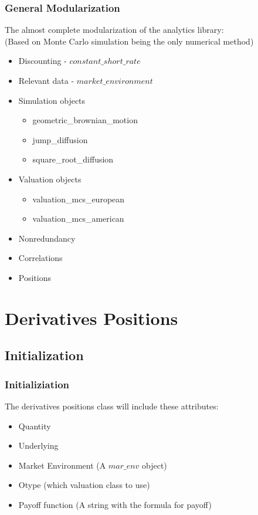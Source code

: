 \documentclass{beamer}
\begin{document}
\begin{frame}
\frametitle{General Modularization}
The almost complete modularization of the analytics library:\\
(Based on Monte Carlo simulation being the only numerical method)
\begin{itemize}
	\item Discounting - $constant\_short\_rate$
	\item Relevant data - $market\_environment$
	\item Simulation objects
	\begin{itemize}
		\item geometric\_brownian\_motion
		\item jump\_diffusion
		\item square\_root\_diffusion
	\end{itemize}
	\item Valuation objects
	\begin{itemize}
		\item valuation\_mcs\_european
		\item valuation\_mcs\_american
	\end{itemize}
	\item Nonredundancy
	\item Correlations
	\item Positions
\end{itemize}
\end{frame}

\section{Derivatives Positions}

\subsection{Initialization}

\begin{frame}
\frametitle{Initializiation}
The derivatives positions class will include these attributes:
\begin{itemize}
	\item Quantity
	\item Underlying
	\item Market Environment (A $mar\_env$ object)
	\item Otype (which valuation class to use)
	\item Payoff function (A string with the formula for payoff)
\end{itemize}
\end{frame}
\end{document}
